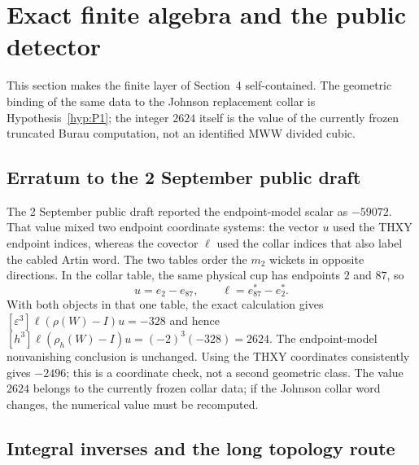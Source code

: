 \section{Exact finite algebra and the public detector}\label{sec:exact-algebra}

This section makes the finite layer of Section~4 self-contained.  The
geometric binding of the same data to the Johnson replacement collar is
Hypothesis~\ref{hyp:P1}; the integer $2624$ itself is the value of the
currently frozen truncated Burau computation, not an identified MWW
divided cubic.

\subsection{Erratum to the 2 September public draft}

The 2 September public draft reported the endpoint-model scalar as $-59072$.
That value mixed
two endpoint coordinate systems: the vector $u$ used the THXY endpoint
indices, whereas the covector $\ell$ used the collar indices that also label
the cabled Artin word.  The two tables order the $m_2$ wickets in opposite
directions.  In the collar table, the same physical cup has endpoints $2$
and $87$, so
\[
  u=e_2-e_{87},\qquad \ell=e_{87}^*-e_2^*.
\]
With both objects in that one table, the exact calculation gives
$[\varepsilon^3]\ell(\rho(W)-I)u=-328$ and hence
$[h^3]\ell(\rho_h(W)-I)u=(-2)^3(-328)=2624$.  The endpoint-model
nonvanishing conclusion is unchanged.
Using the THXY coordinates consistently gives $-2496$; this is a coordinate
check, not a second geometric class.  The value $2624$ belongs to the
currently frozen collar data; if the Johnson collar word changes, the
numerical value must be recomputed.

\subsection{Integral inverses and the long topology route}


